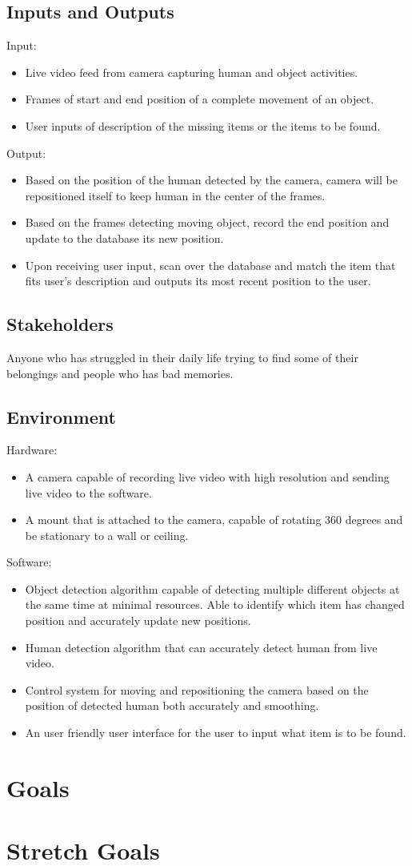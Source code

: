 \documentclass{article}
\begin{document}
\subsection{Inputs and Outputs}
Input:
\begin{itemize}
    \item Live video feed from camera capturing human and object activities. 
    \item Frames of start and end position of a complete movement of an object.
    \item User inputs of description of the missing items or the items to be found.
\end{itemize}
Output:
\begin{itemize}
    \item Based on the position of the human detected by the camera, camera will be repositioned itself to keep human in the center of the frames.
    \item Based on the frames detecting moving object, record the end position and update to the database its new position.
    \item Upon receiving user input, scan over the database and match the item that fits user's description and outputs its most recent position to the user.
\end{itemize}
\subsection{Stakeholders}
Anyone who has struggled in their daily life trying to find some of their belongings and people who has bad memories.
\subsection{Environment}

Hardware:
\begin{itemize}
    \item A camera capable of recording live video with high resolution and sending live video to the software.
    \item A mount that is attached to the camera, capable of rotating 360 degrees and be stationary to a wall or ceiling. 
\end{itemize}
Software:
\begin{itemize}
    \item Object detection algorithm capable of detecting multiple different objects at the same time at minimal resources. Able to identify which item has changed position and accurately update new positions. 
    \item Human detection algorithm that can accurately detect human from live video.
    \item Control system for moving and repositioning the camera based on the position of detected human both accurately and smoothing.
    \item An user friendly user interface for the user to input what item is to be found. 
\end{itemize}

\section{Goals}

\section{Stretch Goals}
\end{document}
